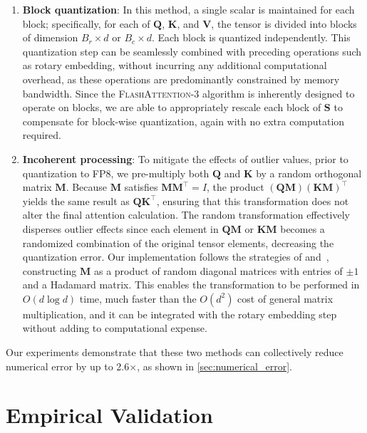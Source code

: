 \begin{enumerate}

\item \textbf{Block quantization}: In this method, a single scalar is maintained for each block; specifically, for each of $\mathbf{Q}$, $\mathbf{K}$, and $\mathbf{V}$, the tensor is divided into blocks of dimension $B_r \times d$ or $B_c \times d$. Each block is quantized independently. This quantization step can be seamlessly combined with preceding operations such as rotary embedding, without incurring any additional computational overhead, as these operations are predominantly constrained by memory bandwidth. Since the \textsc{FlashAttention-3} algorithm is inherently designed to operate on blocks, we are able to appropriately rescale each block of $\mathbf{S}$ to compensate for block-wise quantization, again with no extra computation required.

\item \textbf{Incoherent processing}: To mitigate the effects of outlier values, prior to quantization to FP8, we pre-multiply both $\mathbf{Q}$ and $\mathbf{K}$ by a random orthogonal matrix $\mathbf{M}$. Because $\mathbf{M}$ satisfies $\mathbf{M} \mathbf{M}^\top = I$, the product $(\mathbf{Q} \mathbf{M})(\mathbf{K} \mathbf{M})^\top$ yields the same result as $\mathbf{Q} \mathbf{K}^\top$, ensuring that this transformation does not alter the final attention calculation. The random transformation effectively disperses outlier effects since each element in $\mathbf{Q} \mathbf{M}$ or $\mathbf{K} \mathbf{M}$ becomes a randomized combination of the original tensor elements, decreasing the quantization error. Our implementation follows the strategies of \citet{chee2024quip} and~\citet{tseng2024quip}, constructing $\mathbf{M}$ as a product of random diagonal matrices with entries of $\pm 1$ and a Hadamard matrix. This enables the transformation to be performed in $O(d \log d)$ time, much faster than the $O(d^2)$ cost of general matrix multiplication, and it can be integrated with the rotary embedding step without adding to computational expense.
\end{enumerate}

Our experiments demonstrate that these two methods can collectively reduce numerical error by up to 2.6$\times$, as shown in \cref{sec:numerical_error}.

\section{Empirical Validation}
\label{sec:exp}

